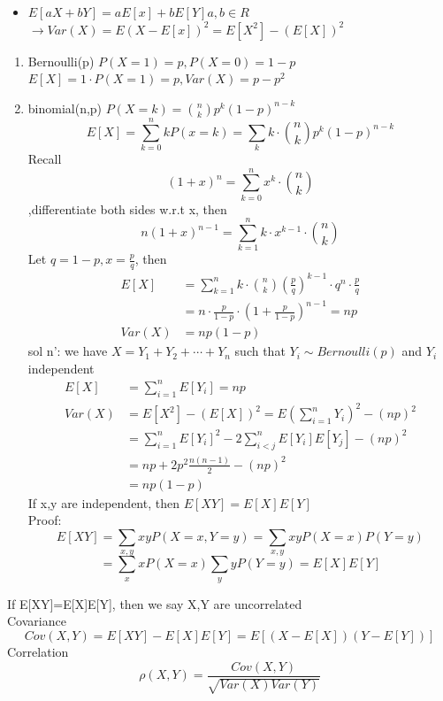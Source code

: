 \begin{itemize}
\item $ E[aX+bY]=aE[x]+bE[Y] a,b \in R$ \\
$\rightarrow Var(X)=E(X-E[x])^2=E[X^2]-(E[X])^2$
\end{itemize}
\begin{example}[]{}
 \begin{enumerate}[label=\circled{\arabic*}] 
 \item Bernoulli(p) $P(X=1)=p,P(X=0)=1-p $\\
 $ E[X]=1 \cdot P(X=1)=p, Var(X)=p-p^2$
 \item binomial(n,p) $ P(X=k)=\binom{n}{k}p^k(1-p)^{n-k} $\\
 $$ E[X]=\sum_{k=0}^{n}kP(x=k)=\sum_{k}k\cdot \binom{n}{k}p^k(1-p)^{n-k}$$
 Recall $$ (1+x)^n= \sum_{k=0}^n x^k\cdot \binom{n}{k}$$,differentiate both sides w.r.t x, then $$ n(1+x)^{n-1}=\sum_{k=1}^n k\cdot x^{k-1}\cdot \binom{n}{k} $$
 Let $q=1-p,x=\frac{p}{q}$, then \begin{align*}{}{}
     E[X]&=\sum_{k=1}^{n}k\cdot \binom{n}{k}(\frac{p}{q})^{k-1}\cdot q^n\cdot \frac{p}{q}\\
     &= n\cdot \frac{p}{1-p}\cdot (1+\frac{p}{1-p})^{n-1}=np\\
     Var(X)&=np(1-p)
    \end{align*}
    sol n': we have $ X=Y_1+Y_2+\cdots+Y_n $  such that $ Y_i\sim Bernoulli(p) $ and $ Y_i $ independent \begin{align*}{}{}
    E[X]&=\sum_{i=1}^{n}E[Y_i]=np\\
    Var(X)&=E[X^2]-(E[X])^2=E(\sum_{i=1}^{n}Y_i)^2-(np)^2\\
    &=\sum_{i=1}^{n}E[Y_i]^2-2\sum_{i<j}^{n}E[Y_i]E[Y_j]-(np)^2\\
    &=np+2p^2\frac{n(n-1)}{2}-(np)^2\\
    &=np(1-p)
    \end{align*}
    If x,y are independent, then $ E[XY]=E[X]E[Y] $
    \\Proof: $$ E[XY]=\sum_{x,y}xyP(X=x,Y=y)=\sum_{x,y}xyP(X=x)P(Y=y)$$ $$=\sum_{x}xP(X=x)\sum_{y}yP(Y=y)=E[X]E[Y] $$
 \end{enumerate}
\end{example}
\begin{definition}[]{}
If E[XY]=E[X]E[Y], then we say X,Y are uncorrelated\\
Covariance $$
    Cov(X,Y)=E[XY]-E[X]E[Y]=E[(X-E[X])(Y-E[Y])]
$$ 
Correlation $$
    \rho(X,Y)=\frac{Cov(X,Y)}{\sqrt{Var(X)Var(Y)}}
$$
\end{definition}
